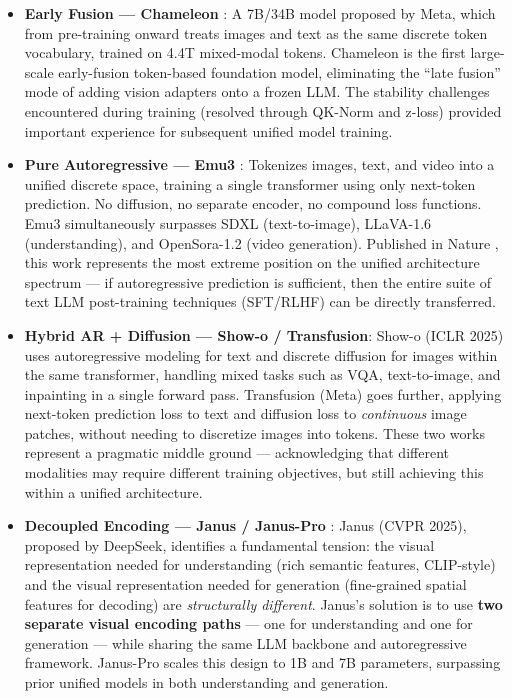 \begin{itemize}[leftmargin=2em]
  \item \textbf{Early Fusion --- Chameleon} \cite{team2024chameleon}:
    A 7B/34B model proposed by Meta,
    which from pre-training onward treats images and text as the same discrete token vocabulary,
    trained on 4.4T mixed-modal tokens.
    Chameleon is the first large-scale early-fusion token-based foundation model,
    eliminating the ``late fusion'' mode of adding vision adapters onto a frozen LLM.
    The stability challenges encountered during training (resolved through QK-Norm and z-loss)
    provided important experience for subsequent unified model training.

  \item \textbf{Pure Autoregressive --- Emu3} \cite{wang2024emu3}:
    Tokenizes images, text, and video into a unified discrete space,
    training a single transformer using only next-token prediction.
    No diffusion, no separate encoder, no compound loss functions.
    Emu3 simultaneously surpasses SDXL (text-to-image), LLaVA-1.6 (understanding),
    and OpenSora-1.2 (video generation).
    Published in Nature \cite{wang2024emu3},
    this work represents the most extreme position on the unified architecture spectrum ---
    if autoregressive prediction is sufficient,
    then the entire suite of text LLM post-training techniques (SFT/RLHF) can be directly transferred.

  \item \textbf{Hybrid AR + Diffusion --- Show-o / Transfusion}:
    Show-o \cite{xie2024showo} (ICLR 2025) uses autoregressive modeling for text and discrete diffusion for images
    within the same transformer,
    handling mixed tasks such as VQA, text-to-image, and inpainting in a single forward pass.
    Transfusion \cite{zhou2024transfusion} (Meta) goes further,
    applying next-token prediction loss to text
    and diffusion loss to \textit{continuous} image patches,
    without needing to discretize images into tokens.
    These two works represent a pragmatic middle ground ---
    acknowledging that different modalities may require different training objectives, but still achieving this within a unified architecture.

  \item \textbf{Decoupled Encoding --- Janus / Janus-Pro} \cite{chen2024janus,chen2025januspro}:
    Janus (CVPR 2025), proposed by DeepSeek, identifies a fundamental tension:
    the visual representation needed for understanding (rich semantic features, CLIP-style)
    and the visual representation needed for generation (fine-grained spatial features for decoding)
    are \textit{structurally different}.
    Janus's solution is to use \textbf{two separate visual encoding paths} ---
    one for understanding and one for generation ---
    while sharing the same LLM backbone and autoregressive framework.
    Janus-Pro scales this design to 1B and 7B parameters,
    surpassing prior unified models in both understanding and generation.
\end{itemize}

